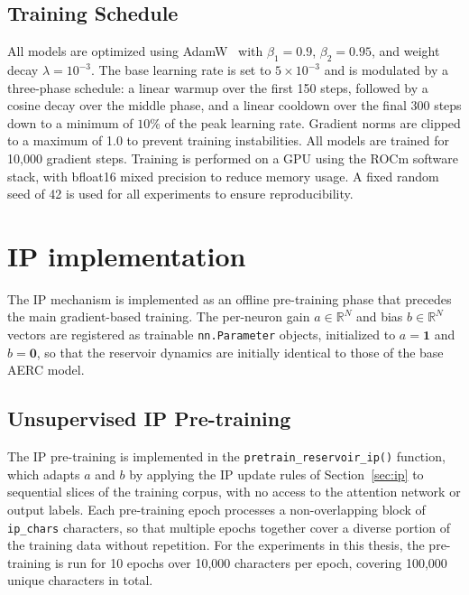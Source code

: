 \documentclass{sapthesis}
\begin{document}
\subsection{Training Schedule}
All models are optimized using AdamW~\cite{loshchilov2019decoupledweightdecayregularization} with $\beta_1 = 0.9$, $\beta_2 = 0.95$, and weight decay $\lambda = 10^{-3}$. The base learning rate is set to $5 \times 10^{-3}$ and is modulated by a three-phase schedule: a linear warmup over the first 150 steps, followed by a cosine decay over the middle phase, and a linear cooldown over the final 300 steps down to a minimum of $10\%$ of the peak learning rate. Gradient norms are clipped to a maximum of 1.0 to prevent training instabilities. All models are trained for 10{,}000 gradient steps. Training is performed on a GPU using the ROCm software stack, with bfloat16 mixed precision to reduce memory usage. A fixed random seed of 42 is used for all experiments to ensure reproducibility.

\section{IP implementation}
\label{sec:ip-impl}
The IP mechanism is implemented as an offline pre-training phase that precedes the main gradient-based training. The per-neuron gain $a \in \mathbb{R}^N$ and bias $b \in \mathbb{R}^N$ vectors are registered as trainable \texttt{nn.Parameter} objects, initialized to $a = \mathbf{1}$ and $b = \mathbf{0}$, so that the reservoir dynamics are initially identical to those of the base AERC model.

\subsection{Unsupervised IP Pre-training}
The IP pre-training is implemented in the \texttt{pretrain\_reservoir\_ip()} function, which adapts $a$ and $b$ by applying the IP update rules of Section~\ref{sec:ip} to sequential slices of the training corpus, with no access to the attention network or output labels. Each pre-training epoch processes a non-overlapping block of \texttt{ip\_chars} characters, so that multiple epochs together cover a diverse portion of the training data without repetition. For the experiments in this thesis, the pre-training is run for 10 epochs over 10{,}000 characters per epoch, covering 100{,}000 unique characters in total.
\end{document}
